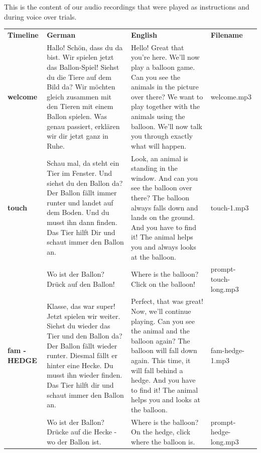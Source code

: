 \documentclass[
  man,floatsintext]{apa6}
\begin{document}
This is the content of our audio recordings that were played as instructions and during voice over trials.

\begin{longtable}[]{@{}
  >{\raggedright\arraybackslash}p{}
  >{\raggedright\arraybackslash}p{}
  >{\raggedright\arraybackslash}p{}
  >{\raggedright\arraybackslash}p{}@{}}
\toprule
\endhead
\textbf{Timeline} & \textbf{German} & \textbf{English} & \textbf{Filename} \\
\textbf{welcome} & Hallo! Schön, dass du da bist. Wir spielen jetzt das Ballon-Spiel! Siehst du die Tiere auf dem Bild da? Wir möchten gleich zusammen mit den Tieren mit einem Ballon spielen. Was genau passiert, erklären wir dir jetzt ganz in Ruhe. & Hello! Great that you're here. We'll now play a balloon game. Can you see the animals in the picture over there? We want to play together with the animals using the balloon. We'll now talk you through exactly what will happen. & welcome.mp3 \\
\textbf{touch} & Schau mal, da steht ein Tier im Fenster. Und siehst du den Ballon da? Der Ballon fällt immer runter und landet auf dem Boden. Und du musst ihn dann finden. Das Tier hilft Dir und schaut immer den Ballon an. & Look, an animal is standing in the window. And can you see the balloon over there? The balloon always falls down and lands on the ground. And you have to find it! The animal helps you and always looks at the balloon. & touch-1.mp3 \\
& Wo ist der Ballon? Drück auf den Ballon! & Where is the balloon? Click on the balloon! & prompt-touch-long.mp3 \\
\textbf{fam - HEDGE} & Klasse, das war super! Jetzt spielen wir weiter. Siehst du wieder das Tier und den Ballon da? Der Ballon fällt wieder runter. Diesmal fällt er hinter eine Hecke. Du musst ihn wieder finden. Das Tier hilft dir und schaut immer den Ballon an. & Perfect, that was great! Now, we'll continue playing. Can you see the animal and the balloon again? The balloon will fall down again. This time, it will fall behind a hedge. And you have to find it! The animal helps you and looks at the balloon. & fam-hedge-1.mp3 \\
& Wo ist der Ballon? Drücke auf die Hecke - wo der Ballon ist. & Where is the balloon? On the hedge, click where the balloon is. & prompt-hedge-long.mp3 \\

\end{longtable}
\end{document}
